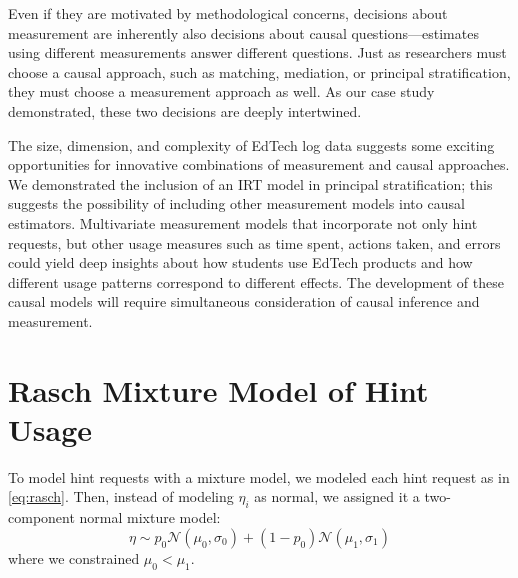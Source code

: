 \documentclass{article}\usepackage[]{graphicx}\usepackage[]{color}
\begin{document}
Even if they are motivated by methodological concerns, decisions about measurement are inherently also decisions about causal questions---estimates using different measurements answer different questions.
Just as researchers must choose a causal approach, such as matching, mediation, or principal stratification, they must choose a measurement approach as well.
As our case study demonstrated, these two decisions are deeply intertwined.

The size, dimension, and complexity of EdTech log data suggests some exciting opportunities for innovative combinations of measurement and causal approaches.
We demonstrated the inclusion of an IRT model in principal stratification; this suggests the possibility of including other measurement models into causal estimators.
Multivariate measurement models that incorporate not only hint requests, but other usage measures such as time spent, actions taken, and errors could yield deep insights about how students use EdTech products and how different usage patterns correspond to different effects.
The development of these causal models will require simultaneous consideration of causal inference and measurement.






\newpage
\appendix

\section{Rasch Mixture Model of Hint Usage}

To model hint requests with a mixture model, we modeled each hint
request as in \eqref{eq:rasch}.
Then, instead of modeling $\eta_i$ as normal, we assigned it a
two-component normal mixture model:
\begin{equation*}
\eta\sim
p_0\mathcal{N}(\mu_0,\sigma_0)+(1-p_0)\mathcal{N}(\mu_1,\sigma_1)
\end{equation*}
where we constrained $\mu_0<\mu_1$.
\end{document}
